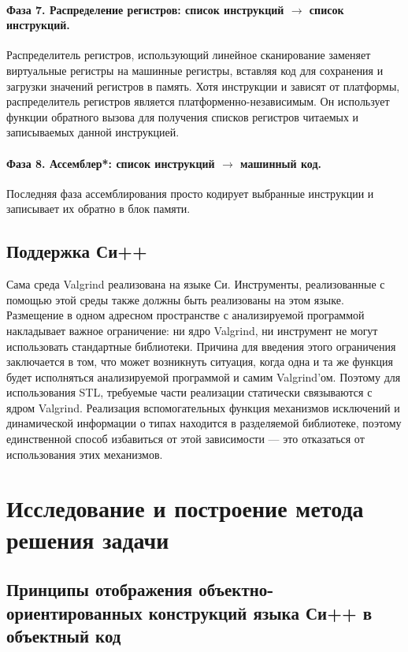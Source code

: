 \documentclass[a4paper,12pt,russian]{article}
\newcommand{\code}[1]{\textsf{#1}}
\begin{document}
\paragraph{Фаза 7. Распределение регистров: список инструкций $\longrightarrow$ список инструкций.}
Распределитель регистров, использующий линейное сканирование заменяет виртуальные регистры на машинные регистры, вставляя код для сохранения и загрузки значений регистров в память.
Хотя инструкции и зависят от платформы, распределитель регистров является платформенно-независимым.
Он использует функции обратного вызова для получения списков регистров читаемых и записываемых данной инструкцией.

\paragraph{Фаза 8. Ассемблер*: список инструкций $\longrightarrow$ машинный код.}
Последняя фаза ассемблирования просто кодирует выбранные инструкции и записывает их обратно в блок памяти.

\subsection{Поддержка Си++}
Сама среда \code{Valgrind} реализована на языке Си. Инструменты, реализованные с помощью этой среды также должны быть реализованы на этом языке.
Размещение в одном адресном пространстве с анализируемой программой накладывает важное ограничение: ни ядро \code{Valgrind}, ни инструмент не могут использовать стандартные библиотеки.
Причина для введения этого ограничения заключается в том, что может возникнуть ситуация, когда одна и та же функция будет исполняться анализируемой программой и самим \code{Valgrind}'ом.
Поэтому для использования \code{STL}, требуемые части реализации статически связываются с ядром \code{Valgrind}.
Реализация вспомогательных функция механизмов исключений и динамической информации о типах находится в разделяемой библиотеке, поэтому единственной способ избавиться от этой зависимости --- это отказаться от использования этих механизмов.

\newpage
\section{Исследование и построение метода решения задачи}
\subsection{Принципы отображения объектно-ориентированных конструкций языка Си++ в объектный код}
\end{document}
